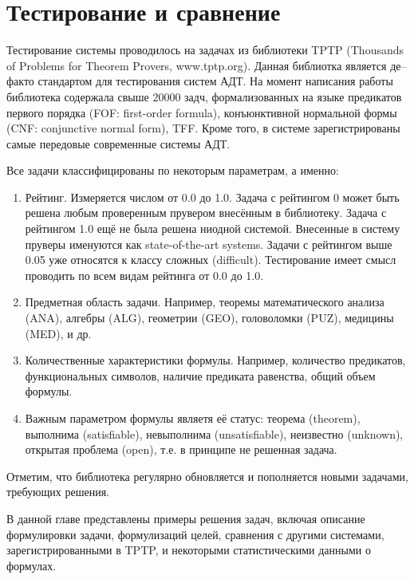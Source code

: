 \section{Тестирование и сравнение}

Тестирование системы проводилось на задачах из библиотеки TPTP (Thousands of Problems for Theorem Provers, www.tptp.org). Данная библиотка является де--факто стандартом для тестирования систем АДТ. На момент написания работы библиотека содержала свыше 20000 задч, формализованных на языке предикатов первого порядка (FOF: first-order formula), конъюнктивной нормальной формы (CNF: conjunctive normal form), TFF. Кроме того, в системе зарегистрированы самые передовые современные системы АДТ.

Все задачи классифицированы по некоторым параметрам, а именно:
\begin{enumerate}
\item Рейтинг. Измеряется числом от 0.0 до 1.0. Задача с рейтингом 0 может быть решена любым проверенным прувером внесённым в библиотеку. Задача с рейтингом 1.0 ещё не была решена ниодной системой. Внесенные в систему пруверы именуются как state-of-the-art systems. Задачи с рейтингом выше 0.05 уже относятся к классу сложных (difficult). Тестирование имеет смысл проводить по всем видам рейтинга от 0.0 до 1.0.
\item Предметная область задачи. Например, теоремы математического анализа (ANA), алгебры (ALG), геометрии (GEO), головоломки (PUZ), медицины (MED), и др.
\item Количественные характеристики формулы. Например, количество предикатов, функциональных символов, наличие предиката равенства, общий объем формулы.
\item Важным параметром формулы являетя её статус: теорема (theorem), выполнима (satisfiable), невыполнима (unsatisfiable), неизвестно (unknown), открытая проблема (open), т.е. в принципе не решенная задача.
\end{enumerate}

Отметим, что библиотека регулярно обновляется и пополняется новыми задачами, требующих решения.


В данной главе представлены примеры решения задач, включая описание формулировки задачи, формулизаций целей, сравнения с другими системами, зарегистрированными в TPTP, и некоторыми статистическими данными о формулах.

